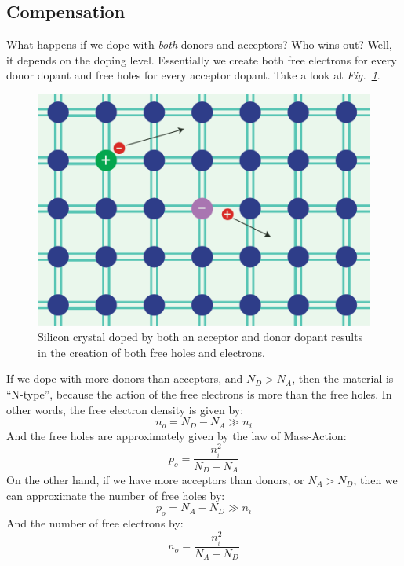 \subsection{Compensation}
What happens if we dope with \textit{both} donors and acceptors?  Who wins out?  Well, it depends on the doping level.  Essentially we create both free electrons for every donor dopant and free holes for every acceptor dopant.  Take a look at \emph{Fig.~\ref{fig:silicoN_Dopant_both}}.
\begin{figure}[tb]
\centering
\includegraphics[width=.5\columnwidth]{silicoN_Dopant_both}
\caption{Silicon crystal doped by both an acceptor and donor dopant results in the creation of both free holes and electrons.}
\label{fig:silicoN_Dopant_both}
\end{figure}

If we dope with more donors than acceptors, and $N_D > N_A$, then the material is “N-type”, because the action of the free electrons is more than the free holes.  In other words, the free electron density is given by:
    \begin{equation}
        {n_o} = {N_D} - {N_A} \gg {n_i}
    \end{equation}
And the free holes are approximately given by the law of Mass-Action:
    \begin{equation}
        {p_o} = \frac{{n_{_i}^2}}{{{N_D} - {N_A}}}
    \end{equation}
On the other hand, if we have more acceptors than donors, or  $N_A > N_D$, then we can approximate the number of free holes by:
    \begin{equation}
        {p_o} = {N_A} - {N_D} \gg {n_i}
    \end{equation}
And the number of free electrons by:
    \begin{equation}
        {n_o} = \frac{{n_{_i}^2}}{{{N_A} - {N_D}}}
    \end{equation}
